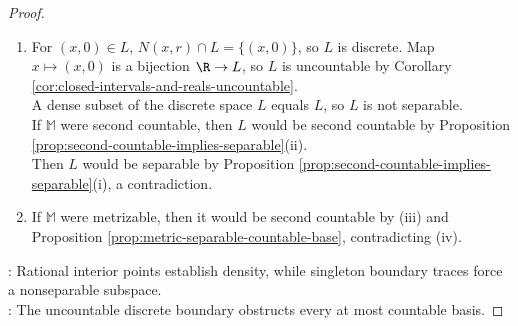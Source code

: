 \begin{counterexample}
\begin{proof}
\begin{enumerate}[label=(\roman*)]
Every member of $\mathcal{B}_{\mathbb{M}}$ contains some $B_{\mathrm{euc}}((a,b),s)$ with $b>s>0$.\\
Choose $q_1,q_2\in\Q$ with $\abs{a-q_1}<s/\sqrt{2}$ and $\abs{b-q_2}<s/\sqrt{2}$ by Theorem \ref{thm:archimedean-and-rational-density}(ii).\\
Then $(q_1,q_2)\in D\cap B_{\mathrm{euc}}((a,b),s)$. Hence every basis set meets $D$, so $\overline{D}^{\,\mathbb{M}}=\mathbb{M}$ by (i), and $(\mathbb{M},\tau_{\mathbb{M}})$ is separable.
\item For $(x,0)\in L$, $N(x,r)\cap L=\{(x,0)\}$, so $L$ is discrete. Map $x\mapsto(x,0)$ is a bijection $\R\to L$, so $L$ is uncountable by Corollary \ref{cor:closed-intervals-and-reals-uncountable}.\\
A dense subset of the discrete space $L$ equals $L$, so $L$ is not separable.\\
If $\mathbb{M}$ were second countable, then $L$ would be second countable by Proposition \ref{prop:second-countable-implies-separable}(ii).\\
Then $L$ would be separable by Proposition \ref{prop:second-countable-implies-separable}(i), a contradiction.
\item If $\mathbb{M}$ were metrizable, then it would be second countable by (iii) and Proposition \ref{prop:metric-separable-countable-base}, contradicting (iv).
\end{enumerate}
: Rational interior points establish density, while singleton boundary traces force a nonseparable subspace.\\
: The uncountable discrete boundary obstructs every at most countable basis.
\end{proof}
\end{counterexample}

